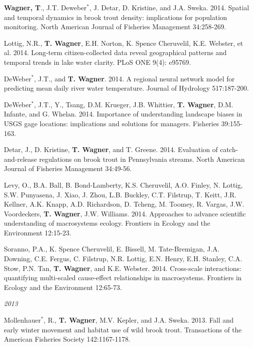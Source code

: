\documentclass[10pt]{article}
\begin{document}
\begin{flushleft}
\begin{etaremune}[start=41]
\item {\bf Wagner, T}., J.T. Deweber$^*$, J. Detar, D. Kristine, and J.A. Sweka. 2014. Spatial and temporal dynamics in brook trout density: implications for population monitoring. North American Journal of Fisheries Management 34:258-269.

\item Lottig, N.R., {\bf T. Wagner}, E.H. Norton, K. Spence Cheruvelil, K.E. Webster, et al. 2014. Long-term citizen-collected data reveal geographical patterns and temporal trends in lake water clarity. PLoS ONE 9(4): e95769. 

\item DeWeber$^*$, J.T., and {\bf T. Wagner}. 2014. A regional neural network model for predicting mean daily river water temperature. Journal of Hydrology 517:187-200.

\item DeWeber$^*$, J.T., Y., Tsang, D.M. Krueger, J.B. Whittier, {\bf T. Wagner}, D.M. Infante, and G. Whelan. 2014. Importance of understanding landscape biases in USGS gage locations: implications and solutions for managers. Fisheries 39:155-163. 

\item Detar, J., D. Kristine, {\bf T. Wagner}, and T. Greene. 2014. Evaluation of catch-and-release regulations on brook trout in Pennsylvania streams. North American Journal of Fisheries Management 34:49-56.

\item Levy, O., B.A. Ball, B. Bond-Lamberty, K.S. Cheruvelil,  A.O. Finley, N. Lottig, S.W. Punyasena, J. Xiao, J. Zhou, L.B. Buckley, C.T. Filstrup, T. Keitt, J.R. Kellner, A.K. Knapp, A.D. Richardson, D. Tcheng, M. Toomey, R. Vargas, J.W. Voordeckers, {\bf T.  Wagner}, J.W. Williams. 2014. Approaches to advance scientific understanding of macrosystems ecology. Frontiers in Ecology and the Environment 12:15-23. 

\item Soranno, P.A., K. Spence Cheruvelil, E. Bissell, M. Tate-Bremigan, J.A. Downing, C.E. Fergus, C. Filstrup, N.R. Lottig, E.N. Henry, E.H. Stanley, C.A. Stow, P.N. Tan, {\bf T. Wagner}, and K.E. Webster. 2014. Cross-scale interactions: quantifying multi-scaled cause-effect relationships in macrosystems. Frontiers in Ecology and the Environment 12:65-73. 

\end{etaremune}
\emph{2013}
\begin{etaremune}[start=28]
\item Mollenhauer$^*$, R., {\bf T. Wagner}, M.V. Kepler, and J.A. Sweka. 2013. Fall and early winter movement and habitat use of wild brook trout. Transactions of the American Fisheries Society 142:1167-1178.


\end{etaremune}
\end{flushleft}
\end{document}
